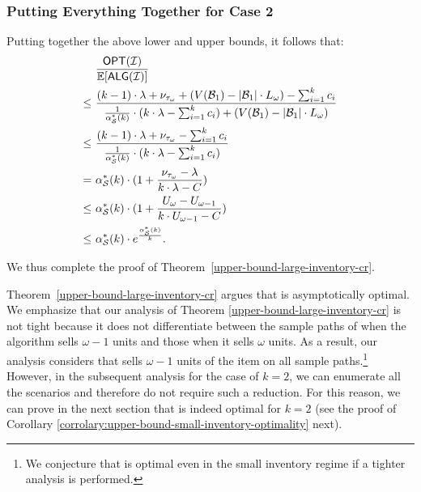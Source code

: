 \subsubsection{Putting Everything Together for Case 2}
Putting together the above lower and upper bounds, it follows that:
\begin{align*}
    & \frac{\textsf{OPT}(\mathcal{I})}{ \mathbb{E}[\textsf{ALG}(\mathcal{I})]} \\
    \leq\ & \frac{(k-1) \cdot \lambda + \nu_{\tau_{\omega}} + (V(\mathcal{B}_{1}) - |\mathcal{B}_{1}| \cdot L_{\omega} ) - \sum_{i=1}^{k} c_{i}}{\frac{1}{\alpha_{\mathcal{S}}^*(k)} \cdot (k \cdot \lambda - \sum_{i=1}^{k} c_{i}) + (V(\mathcal{B}_{1}) - |\mathcal{B}_{1}| \cdot L_{\omega})} \\
    \leq\ & \frac{(k-1) \cdot \lambda + \nu_{\tau_{\omega}} - \sum_{i=1}^{k} c_{i}}{\frac{1}{\alpha_{\mathcal{S}}^*(k)} \cdot (k \cdot \lambda - \sum_{i=1}^{k} c_{i})} \\
    =\ & \alpha_{\mathcal{S}}^*(k) \cdot (1+\frac{\nu_{\tau_{\omega}}-\lambda}{k\cdot \lambda -C}) \\
    \leq\ & \alpha_{\mathcal{S}}^*(k) \cdot (1+\frac{U_{\omega}-U_{\omega-1}}{k\cdot U_{\omega-1}-C}) \\
    \leq\ & \alpha_{\mathcal{S}}^*(k) \cdot e^{\frac{\alpha_{\mathcal{S}}^*(k)}{k}}.
\end{align*} 


We thus complete the proof of Theorem~\ref{upper-bound-large-inventory-cr}.


\begin{remark}
    Theorem~\ref{upper-bound-large-inventory-cr} argues that  \rDynamic is asymptotically optimal. We emphasize that our analysis of Theorem \ref{upper-bound-large-inventory-cr} is not tight because it does not differentiate between the sample paths of \rDynamic when the algorithm sells $\omega-1$ units and those when it sells $\omega$ units. As a result, our analysis considers that \rDynamic sells $\omega-1$ units of the item on all sample paths.\footnote{We conjecture that \rDynamic is optimal even in the small inventory regime if a tighter analysis is performed.} However, in the subsequent analysis for the case of $k=2$, we can enumerate all the scenarios and therefore do not require such a reduction. For this reason,  we can prove in the next section that \rDynamic is indeed optimal for $k=2$ (see the proof of Corollary \ref{corrolary:upper-bound-small-inventory-optimality} next).
\end{remark}


